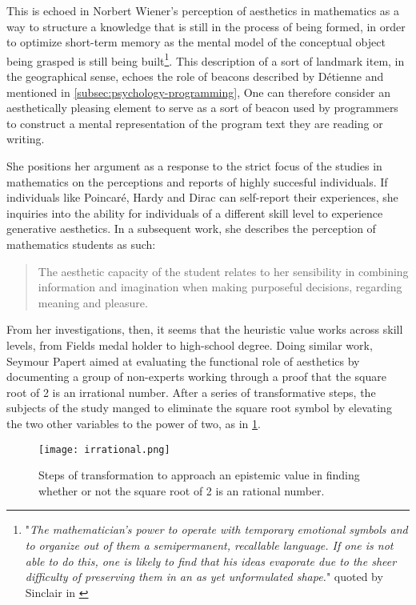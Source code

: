 This is echoed in Norbert Wiener's perception of aesthetics in mathematics as a way to structure a knowledge that is still in the process of being formed, in order to optimize short-term memory as the mental model of the conceptual object being grasped is still being built\footnote{"\emph{The mathematician's power to operate with temporary emotional symbols and to organize out of them a semipermanent, recallable language. If one is not able to do this, one is likely to find that his ideas evaporate due to the sheer difficulty of preserving them in an as yet unformulated shape.}" quoted by Sinclair in \citep{sinclair_roles_2004}}. This description of a sort of landmark item, in the geographical sense, echoes the role of beacons described by Détienne \citep{detienne_software_2001} and mentioned in \ref{subsec:psychology-programming}, One can therefore consider an aesthetically pleasing element to serve as a sort of beacon used by programmers to construct a mental representation of the program text they are reading or writing.

She positions her argument as a response to the strict focus of the studies in mathematics on the perceptions and reports of highly succesful individuals. If individuals like Poincaré, Hardy and Dirac can self-report their experiences, she inquiries into the ability for individuals of a different skill level to experience generative aesthetics. In a subsequent work, she describes the perception of mathematics students as such:

\begin{quote}
    The aesthetic capacity of the student relates to her sensibility in combining information and imagination when making purposeful decisions, regarding meaning and pleasure. \citep{sinclair_aesthetic_2011}
\end{quote}

From her investigations, then, it seems that the heuristic value works across skill levels, from Fields medal holder to high-school degree. Doing similar work, Seymour Papert aimed at evaluating the functional role of aesthetics by documenting a group of non-experts working through a proof that the square root of 2 is an irrational number. After a series of transformative steps, the subjects of the study manged to eliminate the square root symbol by elevating the two other variables to the power of two, as in \ref{graphic:irrational-proof}.

\begin{figure}
    \texttt{[image: irrational.png]}
    \caption{Steps of transformation to approach an epistemic value in finding whether or not the square root of 2 is an rational number.}
    \label{graphic:irrational-proof}
\end{figure}

